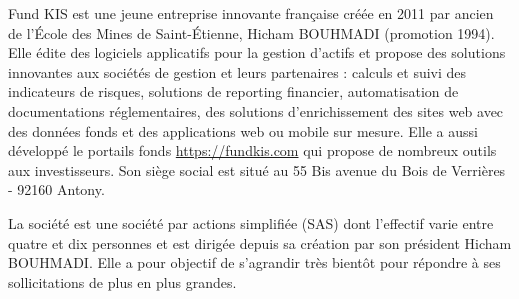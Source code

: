 Fund KIS est une jeune entreprise innovante française créée en 2011 par ancien de l'\'Ecole des Mines de Saint-\'Etienne, Hicham BOUHMADI (promotion 1994). Elle édite des logiciels applicatifs pour la gestion d'actifs et propose des solutions innovantes aux sociétés de gestion et leurs partenaires : calculs et suivi des indicateurs de risques, solutions de reporting financier, automatisation de documentations réglementaires, des solutions d'enrichissement des sites web avec des données fonds et des applications web ou mobile sur mesure. Elle a aussi développé le portails fonds \url{https://fundkis.com} qui propose de nombreux outils aux investisseurs. Son siège social est situé au 55 Bis avenue du Bois de Verrières - 92160 Antony.

\vspace{3mm}

La société est une société par actions simplifiée (SAS) dont l'effectif varie entre quatre et dix personnes et est dirigée depuis sa création par son président Hicham BOUHMADI. Elle a pour objectif de s'agrandir très bientôt pour répondre à ses sollicitations de plus en plus grandes.
